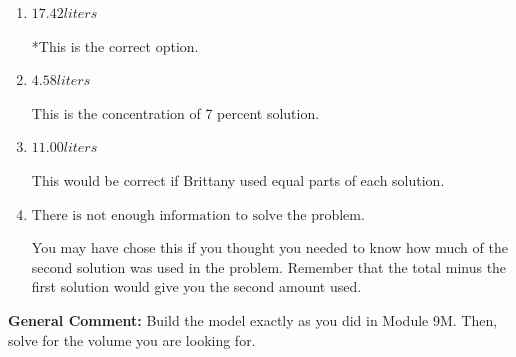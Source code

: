 \documentclass{extbook}[14pt]
\begin{document}
\begin{enumerate}
{\begin{enumerate}[label=\Alph*.]
This was a random value. If this was not a guess, contact the coordinator to talk about how you got this value.
\item \( 17.42 liters \)

*This is the correct option.
\item \( 4.58 liters \)

This is the concentration of 7 percent solution.
\item \( 11.00 liters \)

This would be correct if Brittany used equal parts of each solution.
\item \( \text{There is not enough information to solve the problem.} \)

You may have chose this if you thought you needed to know how much of the second solution was used in the problem. Remember that the total minus the first solution would give you the second amount used.
\end{enumerate}

\textbf{General Comment:} Build the model exactly as you did in Module 9M. Then, solve for the volume you are looking for.
}
\end{enumerate}
\end{document}
